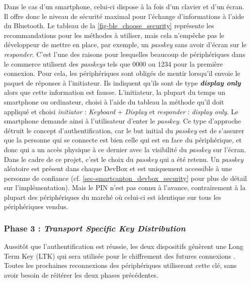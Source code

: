 Dans le cas d'un smartphone, celui-ci dispose à la fois d'un clavier et d'un écran. Il offre donc le niveau de sécurité maximal pour l'échange d'informations à l'aide du Bluetooth. 
Le tableau de la \cref{fig-ble_choose_security} représente les recommandations pour les méthodes à utiliser, mais cela n'empêche pas le développeur de mettre en place, par exemple, un \textit{passkey} sans avoir d'écran sur le \textit{responder}. C'est l'une des raisons pour lesquelles beaucoup de périphériques dans le commerce utilisent des \textit{passkeys} tels que 0000 ou 1234 pour la première connexion. Pour cela, les périphériques sont obligés de mentir lorsqu'il envoie le paquet de réponses à l'initiateur. Ils indiquent qu'ils sont de type \textit{\textbf{display only}} alors que cette information est fausse. L'initiateur, la plupart du temps un smartphone ou ordinateur, choisi à l'aide du tableau la méthode qu'il doit appliqué et choisi \textit{initiator} : \textit{Keyboard} + \textit{Display} et \textit{responder} : \textit{display only}. Le smartphone demande ainsi à l'utilisateur d'enter le \textit{passkey}. 
Ce type d'approche détruit le concept d'authentification, car le but initial du \textit{passkey} est de s'assurer que la personne qui se connecte est bien celle qui est en face du périphérique, et donc qui a un accès physique à ce dernier avec la visibilité du \textit{passkey} sur l'écran. \\

Dans le cadre de ce projet, c'est le choix du \textit{passkey} qui a été retenu. Un \textit{passkey} aléatoire est présent dans chaque DevBox et est uniquement accessible à une personne de confiance (cf. \cref{sec-smartcanton_devbox_security} pour plus de détail sur l'implémentation). Mais le PIN n'est pas connu à l'avance, contrairement à la plupart des périphériques du marché où celui-ci est identique sur tous les périphériques vendus.\\




\subsubsection{Phase 3 : \textit{Transport Specific Key Distribution}}

Aussitôt que l'authentification est réussie, les deux dispositifs génèrent une Long Term Key (LTK) qui sera utilisée pour le chiffrement des futures connexions \cite{Bluetoot97:online}. Toutes les prochaines reconnexions des périphériques utiliseront cette clé, sans avoir besoin de réitérer les deux phases précédentes.




